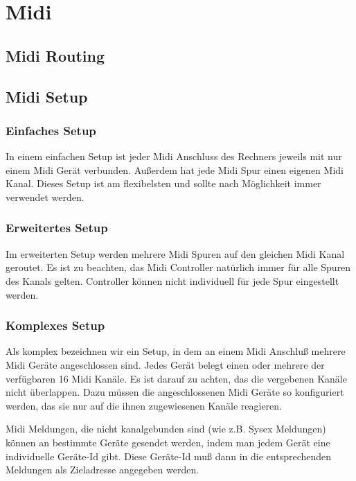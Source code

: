 \chapter{Midi}
  \section{Midi Routing}
  \section{Midi Setup}
  \subsection{Einfaches Setup}

      In einem einfachen Setup ist jeder Midi Anschluss des Rechners 
      jeweils mit nur einem Midi Gerät verbunden. Außerdem hat jede
      Midi Spur einen eigenen Midi Kanal.
      Dieses Setup ist am flexibelsten und sollte nach Möglichkeit
      immer verwendet werden.

  \subsection{Erweitertes Setup}

      Im erweiterten Setup werden mehrere Midi Spuren auf den gleichen
      Midi Kanal geroutet. Es ist zu beachten, das Midi Controller
      natürlich immer für alle Spuren des Kanals gelten. Controller 
      können nicht individuell für jede Spur eingestellt werden.

  \subsection{Komplexes Setup}
      Als komplex bezeichnen wir ein Setup, in dem an einem Midi Anschluß
      mehrere Midi Geräte angeschlossen sind.
      Jedes Gerät belegt einen oder mehrere der verfügbaren 16 Midi
      Kanäle. Es ist darauf zu achten, das die vergebenen Kanäle nicht
      überlappen. Dazu müssen die angeschlossenen Midi Geräte so 
      konfiguriert werden, das sie nur auf die ihnen zugewiesenen Kanäle
      reagieren.

      Midi Meldungen, die nicht kanalgebunden sind (wie z.B. Sysex 
      Meldungen) können an bestimmte Geräte gesendet werden, indem
      man jedem Gerät eine individuelle Geräte-Id gibt. Diese Geräte-Id
      muß dann in die entsprechenden Meldungen als Zieladresse angegeben
      werden. 

